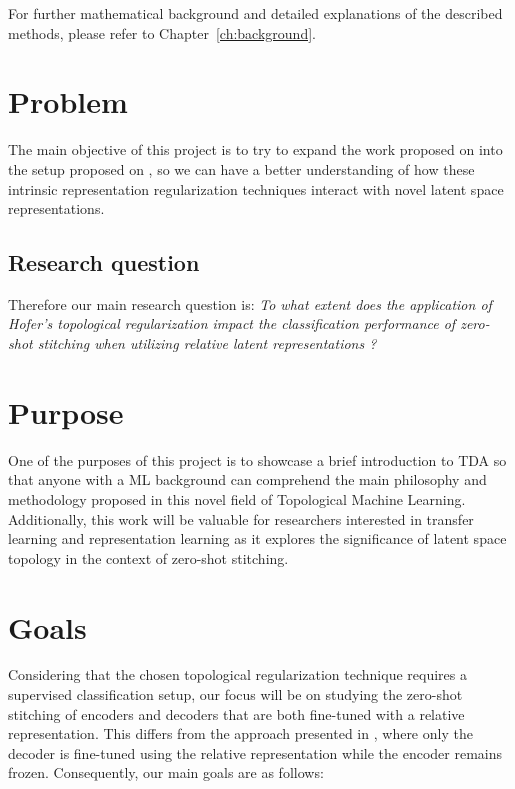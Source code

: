 \documentclass[../main.tex]{subfiles}
\begin{document}
For further mathematical background and detailed explanations of the described methods, please refer to Chapter~\ref{ch:background}.

\section{Problem}
\label{sec:problem}


The main objective of this project is to try to expand the work proposed on \cite{hofer_densified_2021} into the setup proposed on \cite{moschella_relative_2022}, so we can have a better understanding of how these intrinsic representation regularization techniques interact with novel latent space representations.

\subsection{Research question}
\label{sec:researchQuestion}

Therefore our main research question is: \emph{To what extent does the application of Hofer's topological regularization \cite{hofer_densified_2021} impact the classification performance of zero-shot stitching when utilizing relative latent representations \cite{moschella_relative_2022}?}

\section{Purpose}

One of the purposes of this project is to showcase a brief introduction to TDA so that anyone with a ML background can comprehend the main philosophy and methodology proposed in this novel field of Topological Machine Learning. Additionally, this work will be valuable for researchers interested in transfer learning and representation learning as it explores the significance of latent space topology in the context of zero-shot stitching.


\section{Goals}

Considering that the chosen topological regularization technique \cite{hofer_densified_2021} requires a supervised classification setup, our focus will be on studying the zero-shot stitching of encoders and decoders that are both fine-tuned with a relative representation. This differs from the approach presented in \cite{moschella_relative_2022}, where only the decoder is fine-tuned using the relative representation while the encoder remains frozen. Consequently, our main goals are as follows:
\end{document}
